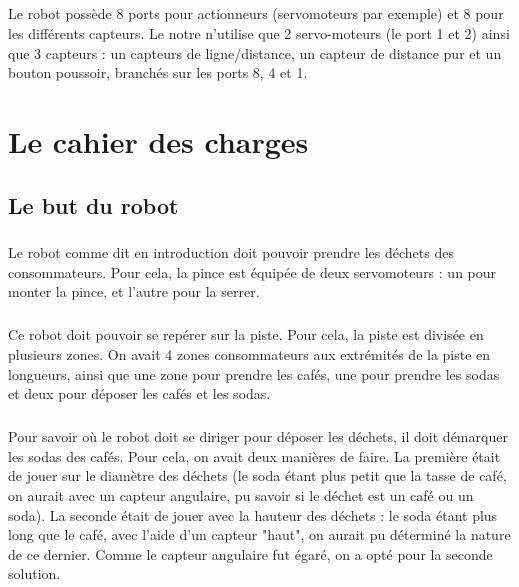 \documentclass[12pt,oneside,a4paper]{book}
\renewcommand{\headrulewidth}{0pt}
\begin{document}
	\paragraph{} Le robot possède 8 ports pour actionneurs (servomoteurs par exemple) et 8 pour les différents capteurs. Le notre n'utilise que 2 servo-moteurs (le port 1 et 2) ainsi que 3 capteurs : un capteurs de ligne/distance, un capteur de distance pur et un bouton poussoir, branchés sur les ports 8, 4 et 1.

\mainmatter
\renewcommand{\headrulewidth}{1pt}

\chapter{Le cahier des charges}
	\thispagestyle{fancy}

\section{Le but du robot}
	\paragraph{} Le robot comme dit en introduction doit pouvoir prendre les déchets des consommateurs. Pour cela, la pince est équipée de deux servomoteurs : un pour monter la pince, et l'autre pour la serrer.
	\paragraph{} Ce robot doit pouvoir se repérer sur la piste. Pour cela, la piste est divisée en plusieurs zones. On avait 4 zones consommateurs aux extrémités de la piste en longueurs, ainsi que une zone pour prendre les cafés, une pour prendre les sodas et deux pour déposer les cafés et les sodas.
	\paragraph{} Pour savoir où le robot doit se diriger pour déposer les déchets, il doit démarquer les sodas des cafés. Pour cela, on avait deux manières de faire. La première était de jouer sur le diamètre des déchets (le soda étant plus petit que la tasse de café, on aurait avec un capteur angulaire, pu savoir si le déchet est un café ou un soda). La seconde était de jouer avec la hauteur des déchets : le soda étant plus long que le café, avec l'aide d'un capteur "haut", on aurait pu déterminé la nature de ce dernier. Comme le capteur angulaire fut égaré, on a opté pour la seconde solution.
\end{document}
